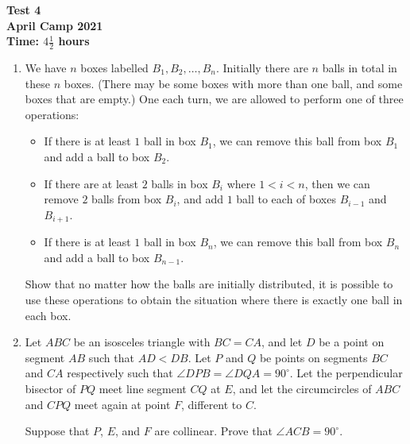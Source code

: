 \documentclass{article}
\begin{document}
\thispagestyle{empty}

\begin{center}
  \textbf{\Large Test 4}
  \\ \vspace{1em}
  \textbf{\large April Camp 2021}
  \\ \vspace{1em}
  \textbf{\large Time: $4\frac{1}{2}$ hours}
\end{center}

\vfill

\begin{enumerate}[leftmargin=0pt, itemsep=18pt]

\item %
We have $n$ boxes labelled $B_1, B_2, \dots, B_n$. Initially there are $n$ balls in total in these $n$ boxes. (There may be some boxes with more than one ball, and some boxes that are empty.) One each turn, we are allowed to perform one of three operations:
\begin{itemize}
  \item If there is at least $1$ ball in box $B_1$, we can remove this ball from box $B_1$ and add a ball to box $B_2$.
  \item If there are at least $2$ balls in box $B_i$ where $1 < i < n$, then we can remove $2$ balls from box $B_i$, and add $1$ ball to each of boxes $B_{i - 1}$ and $B_{i + 1}$.
  \item If there is at least $1$ ball in box $B_n$, we can remove this ball from box $B_n$ and add a ball to box $B_{n - 1}$.
\end{itemize}
Show that no matter how the balls are initially distributed, it is possible to use these operations to obtain the situation where there is exactly one ball in each box.


\item %
Let $ABC$ be an isosceles triangle with $BC = CA$, and let $D$ be a point on segment $AB$ such that $AD < DB$.
Let $P$ and $Q$ be points on segments $BC$ and $CA$ respectively such that $\angle DPB = \angle DQA = 90^\circ$.
Let the perpendicular bisector of $PQ$ meet line segment $CQ$ at $E$, and let the circumcircles of $ABC$ and $CPQ$ meet again at point $F$, different to $C$.

Suppose that $P$, $E$, and $F$ are collinear.
Prove that $\angle ACB = 90^\circ$.



\end{enumerate}
\end{document}
